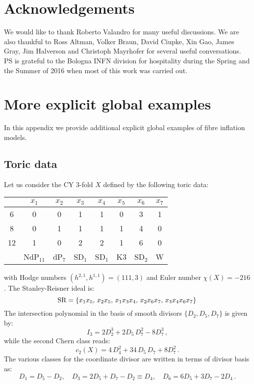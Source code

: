 \documentclass[11pt,a4paper]{article}
\newcommand{\be}{\begin{equation}}
\newcommand{\ee}{\end{equation}}
\def\nn{\nonumber}
\begin{document}
\section*{Acknowledgements}

We would like to thank Roberto Valandro for many useful discussions. We are also thankful to Ross Altman, Volker Braun, David Ciupke, Xin Gao, James Gray, Jim Halverson and Christoph Mayrhofer for several useful conversations. PS is grateful to the Bologna INFN division for hospitality during the Spring and the Summer of 2016 when most of this work was carried out.


\appendix

\section{More explicit global examples}
\label{App}

In this appendix we provide additional explicit global examples of fibre inflation models.


\subsection{Toric data}

Let us consider the CY 3-fold $X$ defined by the following toric data:
\begin{table}[H]
  \centering
 \begin{tabular}{|c|ccccccc|}
\hline
     & $x_1$  & $x_2$  & $x_3$  & $x_4$  & $x_5$ & $x_6$  & $x_7$       \\
    \hline
 6  & 0  & 0 & 1 & 1 & 0 & 3  & 1   \\
 8  & 0  & 1 & 1 & 1 & 1 & 4  & 0   \\
12 & 1  & 0 & 2 & 2 & 1 & 6  & 0   \\   \hline
    &  NdP$_{11}$  & dP$_7$  & SD$_1$ &  SD$_1$ & K3 & SD$_2$  & W  \\
    \hline
  \end{tabular}
 \end{table}
 \noindent
with Hodge numbers $(h^{2,1}, h^{1,1}) = (111, 3)$ and Euler number $\chi(X)=-216$.
The Stanley-Reisner ideal is:
\be
{\rm SR} =  \{ x_1 x_5, \, x_2 x_5, \, x_1 x_3 x_4, \, x_2 x_6 x_7, \, x_3 x_4 x_6 x_7\} \, \nn
\ee
The intersection polynomial in the basis of smooth divisors $\{D_2, D_5, D_7\}$ is given by:
\be
I_3=2 D_2^3 + 2 D_5\, D_7^2 - 8 D_7^3\,,
\label{eq:I3a}
\ee
while the second Chern class reads:
\be
c_2(X) = 4\, D_4^2 + 34 \, D_5 \, D_7 + 8 D_7^2\,.
\label{eq:c2a}
\ee
The various classes for the coordinate divisor are written in terms of divisor basis as:
\be
D_1 = D_5 - D_2, \quad D_3  = 2 D_5 +D_7- D_2 \equiv D_4, \quad D_6 = 6D_5 + 3 D_7-2 D_4\,. 
\label{Ds}
\ee
\end{document}
